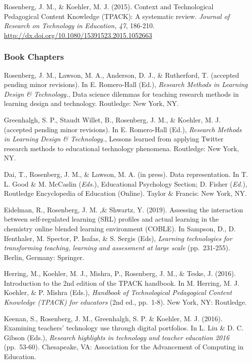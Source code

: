 \documentclass[14,]{article}
\begin{document}
Rosenberg, J. M., \& Koehler, M. J. (2015). Context and Technological
Pedagogical Content Knowledge (TPACK): A systematic review.
\emph{Journal of Research on Technology in Education, 47}, 186-210.
\url{http://dx.doi.org/10.1080/15391523.2015.1052663}

\hypertarget{book-chapters}{%
\subsubsection{Book Chapters}\label{book-chapters}}

Rosenberg, J. M., Lawson, M. A., Anderson, D. J., \& Rutherford, T.
(accepted pending minor revisions). In E. Romero-Hall (Ed.),
\emph{Research Methods in Learning Design \& Technology.}, Data science
dilemmas for teaching research methods in learning design and
technology. Routledge: New York, NY.

Greenhalgh, S. P., Staudt Willet, B., Rosenberg, J. M., \& Koehler, M.
J. (accepted pending minor revisions). In E. Romero-Hall (Ed.),
\emph{Research Methods in Learning Design \& Technology.}, Lessons
learned from applying Twitter research methods to educational technology
phenomena. Routledge: New York, NY.

Dai, T., Rosenberg, J. M., \& Lawson, M. A. (in press). Data
representation. In T. L. Good \& M. McCaslin (\emph{Eds.}), Educational
Psychology Section; D. Fisher (\emph{Ed.}), Routledge Encyclopedia of
Education (Online). Taylor \& Francis: New York, NY.

Eidelman, R., Rosenberg, J. M. ,\& Shwartz, Y. (2019). Assessing the
interaction between self-regulated learning (SRL) profiles and actual
learning in the chemistry online blended learning environment (COBLE).
In Sampson, D., D. Ifenthaler, M. Spector, P. Isafas, \& S. Sergis
(Eds), \emph{Learning technologies for transforming teaching, learning
and assessment at large scale} (pp.~231-255). Berlin, Germany: Springer.

Herring, M., Koehler, M. J., Mishra, P., Rosenberg, J. M., \& Teske, J.
(2016). Introduction to the 2nd edition of the TPACK handbook. In M.
Herring, M. J. Koehler, \& P. Mishra (Eds.), \emph{Handbook of
Technological Pedagogical Content Knowledge (TPACK) for educators} (2nd
ed., pp.~1-8). New York, NY: Routledge.

Keenan, S., Rosenberg, J. M., Greenhalgh, S. P. \& Koehler, M. J.
(2016). Examining teachers' technology use through digital portfolios.
In L. Liu \& D. C. Gibson (Eds.), \emph{Research highlights in
technology and teacher education 2016} (pp.~53-60). Chesapeake, VA:
Association for the Advancement of Computing in Education.
\end{document}
